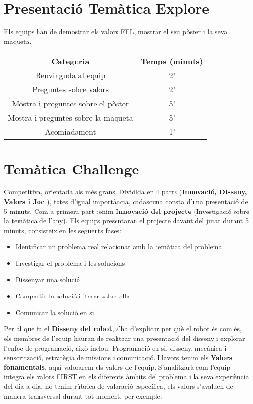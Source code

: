 \documentclass{article}
\begin{document}
\section{Presentació Temàtica Explore}

Els equips han de demostrar els valors FFL, mostrar el seu pòster i la seva maqueta.
\break
\break
\begin{tabular}{ |c|c| } 
 \hline
 \textbf{Categoria} & \textbf{Temps (minuts)}\\ 
 Benvinguda al equip  & 2'  \\ 
 Preguntes sobre valors & 2'  \\ 
 Mostra i preguntes sobre el pòster & 5' \\ 
 Mostra i preguntes sobre la maqueta & 5'  \\ 
 Acomiadament & 1'  \\ 
 \hline
\end{tabular}


\section{Temàtica Challenge}

Competitiva, orientada als més grans. Dividida en 4 parts (\textbf{Innovació, Disseny, Valors i Joc} ), totes d'igual importància, cadascuna consta d’una presentació de 5 minuts.
\hfill \break\hfill \break
Com a primera part tenim \textbf{Innovació del projecte} (Investigació sobre la temàtica de l'any). Els equips presentaran el projecte davant del jurat durant 5 minuts, consisteix en les següents fases:

\begin{itemize}
    \item Identificar un problema real relacionat amb la temàtica del problema
    \item Investigar el problema i les solucions
    \item Dissenyar una solució
    \item Compartir la solució i iterar sobre ella
    \item Comunicar la solució en si
\end{itemize}

Per al que fa el \textbf{Disseny del robot}, s'ha d'explicar per què el robot és com és, els membres de l'equip hauran de realitzar una presentació del disseny i explorar l'enfoc de programació, això inclou: Programació en si, disseny, mecànica i sensorització, estratègia de missions i comunicació.
\hfill \break\hfill \break
Llavors tenim els \textbf{Valors fonamentals}, aquí valorarem els valors de l'equip. S'analitzarà com l'equip integra els valors FIRST en els diferents àmbits del problema i la seva experiència del dia a dia, no tenim rúbrica de valoració específica, els valors s'avaluen de manera transversal durant tot moment, per exemple:
\end{document}

